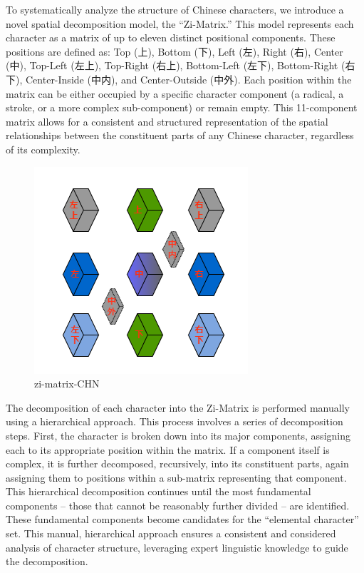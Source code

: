 To systematically analyze the structure of Chinese characters, we
introduce a novel spatial decomposition model, the ``Zi-Matrix.'' This
model represents each character as a matrix of up to eleven distinct
positional components. These positions are defined as: Top (上), Bottom
(下), Left (左), Right (右), Center (中), Top-Left (左上), Top-Right
(右上), Bottom-Left (左下), Bottom-Right (右下), Center-Inside (中内),
and Center-Outside (中外). Each position within the matrix can be either
occupied by a specific character component (a radical, a stroke, or a
more complex sub-component) or remain empty. This 11-component matrix
allows for a consistent and structured representation of the spatial
relationships between the constituent parts of any Chinese character,
regardless of its complexity.

\begin{figure}
\centering
\includegraphics{./images/zi-matrix-CHN.png}
\caption{zi-matrix-CHN}
\end{figure}

The decomposition of each character into the Zi-Matrix is performed
manually using a hierarchical approach. This process involves a series
of decomposition steps. First, the character is broken down into its
major components, assigning each to its appropriate position within the
matrix. If a component itself is complex, it is further decomposed,
recursively, into its constituent parts, again assigning them to
positions within a sub-matrix representing that component. This
hierarchical decomposition continues until the most fundamental
components -- those that cannot be reasonably further divided -- are
identified. These fundamental components become candidates for the
``elemental character'' set. This manual, hierarchical approach ensures
a consistent and considered analysis of character structure, leveraging
expert linguistic knowledge to guide the decomposition.

